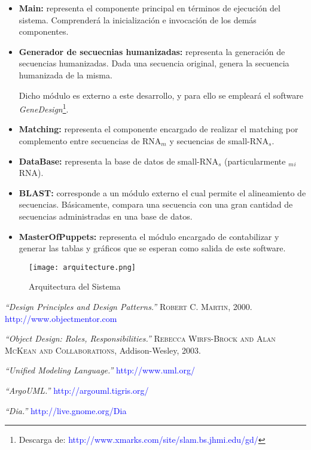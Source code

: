 \documentclass[12pt,a4paper,spanish]{article}
\begin{document}
\begin{itemize}
  \item \textbf{Main:} representa el componente principal en términos de ejecución del sistema. Comprenderá la  
  inicialización e invocación de los demás componentes.

  \item \textbf{Generador de secuecnias humanizadas:} representa la generación de secuencias humanizadas. Dada una secuencia original, genera la secuencia humanizada de la misma.


Dicho
   módulo es externo a este desarrollo, y para ello se empleará el software \emph{GeneDesign}\footnote{Descarga de:  
  \textcolor{blue}{http://www.xmarks.com/site/slam.bs.jhmi.edu/gd/}}.

  \item \textbf{Matching:} representa el componente encargado de realizar el matching por complemento entre secuencias
  de RNA$_m$ y secuencias de small-RNA$_s$. 

  \item \textbf{DataBase:} representa la base de datos de small-RNA$_s$ (particularmente $_m$$_i$RNA).

  \item \textbf{BLAST:} corresponde a un módulo externo el cual permite el alineamiento de secuencias. Básicamente, 	 
  compara una secuencia con una gran cantidad de secuencias administradas en una base de datos. 

  \item \textbf{MasterOfPuppets:} representa el módulo encargado de contabilizar y generar las tablas y gráficos que se  
  esperan como salida de este software. 
\end{itemize}


\begin{figure}[!hbtp]
	\begin{center}
		\texttt{[image: arquitecture.png]}
		\caption{Arquitectura del Sistema}
		\label{arquitecture}
	\end{center}
\end{figure}





\begin{thebibliography}{99}
\small  {} {\em{“Design Principles and Design Patterns.”}} 
		\textsc{Robert C. Martin}, 2000. \textcolor{blue}{http://www.objectmentor.com}
  
\small  {} {\em{“Object Design: Roles, Responsibilities.”}} 
		\textsc{Rebecca Wirfs-Brock and Alan McKean and Collaborations}, Addison-Wesley, 2003.  

\small  {} {\em{“Unified Modeling Language.”}} \textcolor{blue}{http://www.uml.org/}

\small  {} {\em{“ArgoUML.”}} \textcolor{blue}{http://argouml.tigris.org/}

\small {} {\em{“Dia.”}} \textcolor{blue}{http://live.gnome.org/Dia}
\end{thebibliography}
\end{document}
